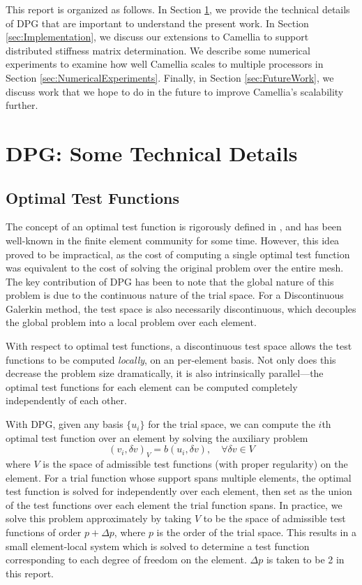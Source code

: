 \documentclass{article}
\begin{document}
This report is organized as follows.  In Section \ref{sec:DPGIntro}, we provide the technical details of DPG that are important to understand the present work.  In Section \ref{sec:Implementation}, we discuss our extensions to Camellia to support distributed stiffness matrix determination.  We describe some numerical experiments to examine how well Camellia scales to multiple processors in Section \ref{sec:NumericalExperiments}.  Finally, in Section \ref{sec:FutureWork}, we discuss work that we hope to do in the future to improve Camellia's scalability further.

\section{DPG: Some Technical Details}\label{sec:DPGIntro}
\subsection{Optimal Test Functions}

The concept of an optimal test function is rigorously defined in \cite{DPG2}, and has been well-known in the finite element community for some time. However, this idea proved to be impractical, as the cost of computing a single optimal test function was equivalent to the cost of solving the original problem over the entire mesh. The key contribution of DPG has been to note that the global nature of this problem is due to the continuous nature of the trial space. For a Discontinuous Galerkin method, the test space is also necessarily discontinuous, which decouples the global problem into a local problem over each element. 

With respect to optimal test functions, a discontinuous test space allows the test functions to be computed \emph{locally}, on an per-element basis. Not only does this decrease the problem size dramatically, it is also intrinsically parallel---the optimal test functions for each element can be computed completely independently of each other. 

With DPG, given any basis $\{u_i\}$ for the trial space, we can compute the $i$th optimal test function over an element by solving the auxiliary problem 
\[
(v_i, \delta v)_V = b(u_i,\delta v), \quad \forall \delta v\in V
\]
where $V$ is the space of admissible test functions (with proper regularity) on the element. For a trial function whose support spans multiple elements, the optimal test function is solved for independently over each element, then set as the union of the test functions over each element the trial function spans. In practice, we solve this problem approximately by taking $V$ to be the space of admissible test functions of order $p+\Delta p$, where $p$ is the order of the trial space. This results in a small element-local system which is solved to determine a test function corresponding to each degree of freedom on the element. $\Delta p$ is taken to be 2 in this report. 
\end{document}
